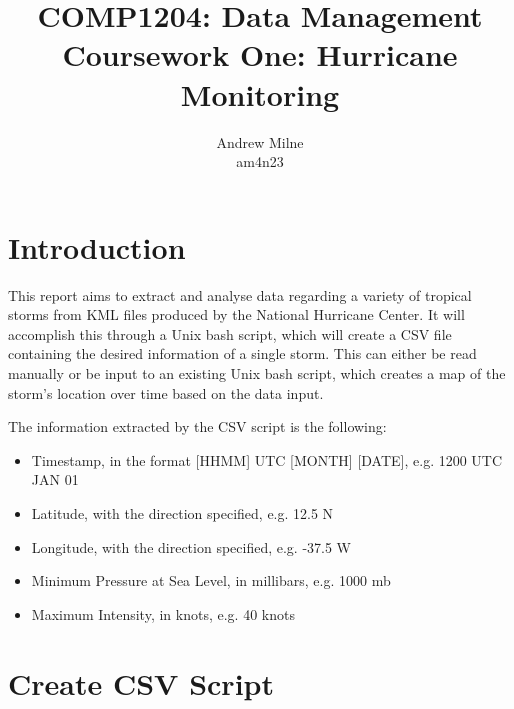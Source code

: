 \documentclass[]{article}
\title{COMP1204: Data Management \\ Coursework One: Hurricane Monitoring }
\author{Andrew Milne \\ am4n23}
\begin{document}
\lstset{upquote=true}

\maketitle

\section{Introduction}

This report aims to extract and analyse data regarding a variety of tropical storms from KML files produced by the National Hurricane Center. It will accomplish this through a Unix bash script, which will create a CSV file containing the desired information of a single storm. This can either be read manually or be input to an existing Unix bash script, which creates a map of the storm's location over time based on the data input.

The information extracted by the CSV script is the following:

\begin{itemize}
    \item Timestamp, in the format [HHMM] UTC [MONTH] [DATE], e.g. 1200 UTC JAN 01
    \item Latitude, with the direction specified, e.g. 12.5 N
    \item Longitude, with the direction specified, e.g. -37.5 W
    \item Minimum Pressure at Sea Level, in millibars, e.g. 1000 mb
    \item Maximum Intensity, in knots, e.g. 40 knots
\end{itemize}

\section{Create CSV Script}
\end{document}
